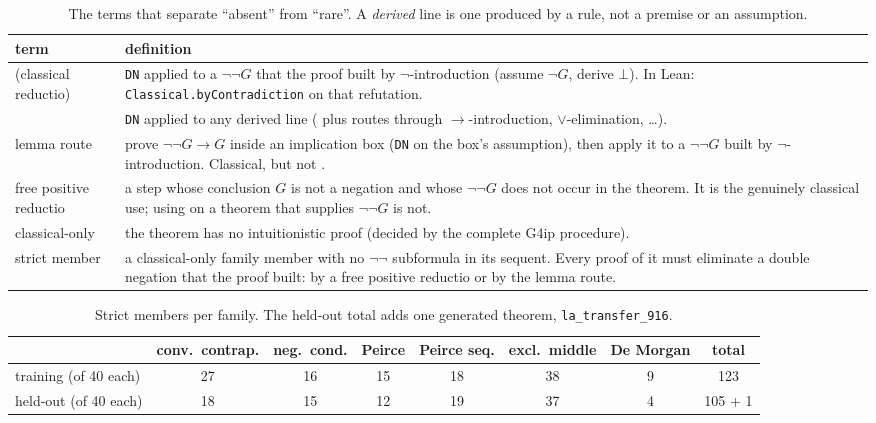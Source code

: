 \begin{table}[t]
\centering\small
\caption{The terms that separate ``absent'' from ``rare''. A \emph{derived} line is one produced by a rule, not a premise
or an assumption.}
\label{tab:concepts}
\begin{tabular}{p{3.0cm}p{12.2cm}}
\toprule
term & definition \\
\midrule
\sig{} (classical reductio) & \texttt{DN} applied to a $\neg\neg G$ that the proof built by $\neg$-introduction
(assume $\neg G$, derive $\bot$). In Lean: \texttt{Classical.byContradiction} on that refutation. \\
\sigp{} & \texttt{DN} applied to any derived line (\sig{} plus routes through $\to$-introduction, $\lor$-elimination,
\dots). \\
lemma route & prove $\neg\neg G \to G$ inside an implication box (\texttt{DN} on the box's assumption), then apply it to a
$\neg\neg G$ built by $\neg$-introduction. Classical, but not \sigp{}. \\
free positive reductio & a \sigp{} step whose conclusion $G$ is not a negation and whose $\neg\neg G$ does not occur in
the theorem. It is the genuinely classical use; using \sig{} on a theorem that supplies $\neg\neg G$ is not. \\
classical-only & the theorem has no intuitionistic proof (decided by the complete G4ip procedure). \\
strict member & a classical-only family member with no $\neg\neg$ subformula in its sequent. Every proof of it must
eliminate a double negation that the proof built: by a free positive reductio or by the lemma route. \\
\bottomrule
\end{tabular}
\end{table}

\begin{table}[t]
\centering\small
\caption{Strict members per family. The held-out total adds one generated theorem, \texttt{la\_transfer\_916}.}
\label{tab:families}
\setlength{\tabcolsep}{4pt}
\begin{tabular}{lcccccc|c}
\toprule
 & conv.\ contrap. & neg.\ cond. & Peirce & Peirce seq. & excl.\ middle & De Morgan & total \\
\midrule
training (of 40 each) & 27 & 16 & 15 & 18 & 38 & 9 & 123 \\
held-out (of 40 each) & 18 & 15 & 12 & 19 & 37 & 4 & 105 + 1 \\
\bottomrule
\end{tabular}
\end{table}

